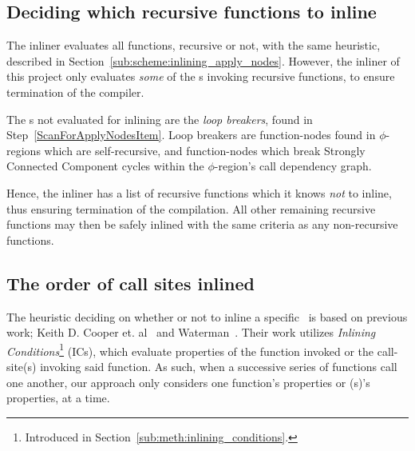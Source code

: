 \subsection{Deciding which recursive functions to inline}
\label{sub:scheme:inlining_recur_apply_nodes}

The inliner evaluates all functions, recursive or not, with the same heuristic,
described in Section~\ref{sub:scheme:inlining_apply_nodes}. However, the inliner
of this project only evaluates \textit{some} of the \applyNode s invoking
recursive functions, to ensure termination of the compiler.

The \applyNode s not evaluated for inlining are the \textit{loop breakers},
found in Step~\ref{ScanForApplyNodesItem}. Loop breakers are function-nodes
found in $\phi$-regions which are self-recursive, and function-nodes which break
Strongly Connected Component cycles within the $\phi$-region's call dependency
graph.


Hence, the inliner has a list of recursive functions which it knows \textit{not}
to inline, thus ensuring termination of the compilation. All other remaining
recursive functions may then be safely inlined with the same criteria as any
non-recursive functions.

\subsection{The order of call sites inlined}
\label{sub:scheme:ordering_apply_nodes}


The heuristic deciding on whether or not to inline a specific \applyNode~is
based on previous work; Keith D. Cooper et. al~\cite{AdaptvStratInlSubst} and
Waterman~\cite{AdaptvCompilAndInlingWaterman}. Their work utilizes
\textit{Inlining Conditions}\footnote{Introduced in
Section~\ref{sub:meth:inlining_conditions}.} (ICs), which evaluate properties of
the function invoked or the call-site(s) invoking said function. As such, when a
successive series of functions call one another, our approach only considers one
function's properties or \applyNode (s)'s properties, at a time.

